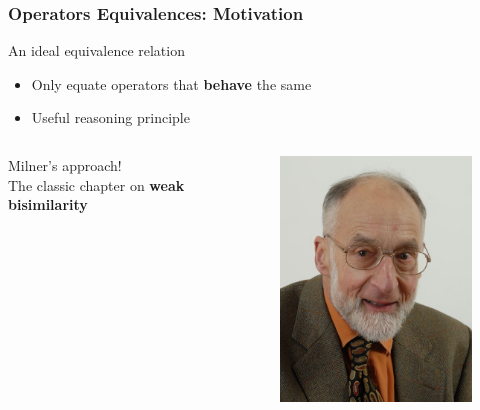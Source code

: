 \documentclass[fleqn,aspectratio=169,10pt]{beamer}
\begin{document}
\begin{frame}[fragile]
  \frametitle{Operators Equivalences: Motivation}
  \begin{block}{An ideal equivalence relation}
    \begin{itemize}
      \item Only equate operators that \textbf{behave} the same
      \item Useful reasoning principle
    \end{itemize}
  \end{block}
  \pause
  \begin{itemize}

          \begin{columns}
            \begin{column}{.42\textwidth}
              \item Milner's approach!\\ The classic chapter on \textbf{weak bisimilarity}
            \end{column}
            \begin{column}{.1\textwidth}
              \begin{figure}
                \includegraphics[width=1\textwidth]{milner.jpg}

\end{figure}
\end{column}
\end{columns}
\end{itemize}
\end{frame}
\end{document}
